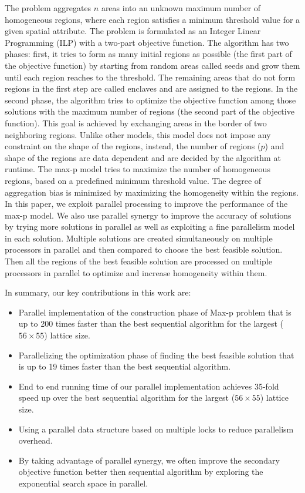\documentclass[conference]{IEEEtran}
\begin{document}
The problem aggregates $n$ areas into an unknown maximum number of homogeneous regions, where each region satisfies a minimum threshold value for a
given spatial attribute. The problem is formulated as an Integer Linear Programming (ILP) with a two-part objective function. The algorithm has two phases: first, it tries to form as many initial regions as possible (the first part of the objective function) by starting from random areas called seeds and grow them until each region reaches to the threshold. The remaining areas that do not form regions in the first step are called enclaves and are assigned to the regions. In the second phase, the algorithm tries to optimize the objective function among those solutions with the maximum number of regions (the second part of the objective function). This goal is achieved by exchanging areas in the border of two neighboring regions. Unlike other models, this model does not impose any constraint on the shape of the regions, instead, the number of regions ($p$) and shape of the regions are data dependent and are decided by the algorithm at runtime. The
max-p model tries to maximize the number of homogeneous regions, based on a predefined minimum threshold value. The degree of aggregation bias is minimized by maximizing the homogeneity within the regions. In this paper, we exploit parallel processing to improve the performance of the max-p model. We also use parallel synergy to improve the accuracy of solutions by trying more solutions in parallel as well as exploiting a fine parallelism model in each solution. Multiple solutions are created simultaneously on multiple processors in parallel and then compared to choose the best feasible solution. Then all the regions of the best feasible solution are processed on multiple processors in parallel to optimize and increase homogeneity within them.

In summary, our key contributions in this work are:
\begin{itemize}

\item Parallel implementation of the construction phase of Max-p problem that is up to 200 times faster than the best sequential algorithm for the largest ($56\times 55$) lattice size.

\item Parallelizing the optimization phase of finding the best feasible solution that is up to 19 times faster than the best sequential algorithm.

\item End to end running time of our parallel implementation achieves 35-fold speed up over the best sequential algorithm for the largest ($56\times 55$) lattice size.

\item Using a parallel data structure based on multiple locks to reduce parallelism overhead.

\item By taking advantage of parallel synergy, we often improve the secondary objective function better then sequential algorithm by exploring the exponential search space in parallel.

\end{itemize}
\end{document}
